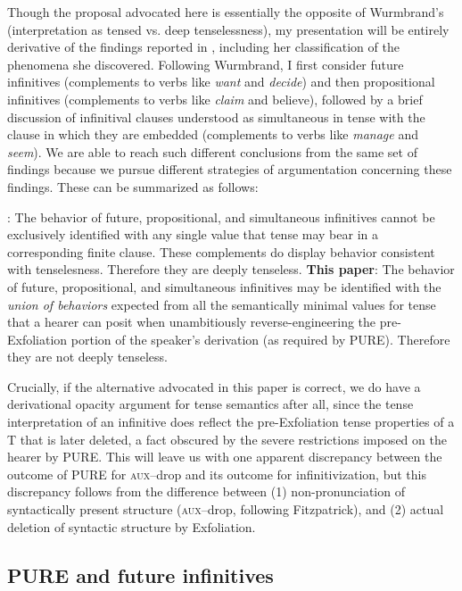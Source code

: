 \documentclass[output=paper]{langscibook}
\begin{document}
Though the proposal advocated here is essentially the opposite of Wurmbrand's (interpretation as tensed vs. deep tenselessness), my presentation will be entirely derivative of the findings reported in \citet{Wurmbrand:2014aa}, including her classification of the phenomena she discovered. Following Wurmbrand, I first consider future infinitives (complements to verbs like \textit{want} and \textit{decide}) and then propositional infinitives (complements to verbs like \textit{claim} and believe), followed by a brief discussion of infinitival clauses understood as simultaneous in tense with the clause in which they are embedded (complements to verbs like \textit{manage} and \textit{seem}). We are able to reach such different conclusions from the same set of findings because we pursue different strategies of argumentation concerning these findings. These can be summarized as follows:

\pex
{}
\a \textbf{\citet{Wurmbrand:2014aa}}: The behavior of future, propositional, and simultaneous infinitives cannot be exclusively identified with any single value that tense may bear in a corresponding finite clause. These complements do display behavior consistent with tenselesness.  Therefore they are deeply tenseless.
\a \textbf{This paper}: The behavior of future, propositional, and simultaneous infinitives may be identified with the \textit{union of behaviors} expected from all the semantically minimal values for tense that a hearer can posit when unambitiously reverse-engineering the pre-Exfoliation portion of the speaker's derivation (as required by PURE).  Therefore they are not deeply tenseless.
\xe

Crucially, if the alternative advocated in this paper is correct, we do have a derivational opacity argument for tense semantics after all, since the tense interpretation of an infinitive does reflect the pre-Exfoliation tense properties of a T that is later deleted, a fact obscured by the severe restrictions imposed on the hearer by PURE. This will leave us with one apparent discrepancy between the outcome of PURE for \textsc{aux}--drop and its outcome for infinitivization, but this discrepancy follows from the difference between (1) non-pronunciation of syntactically present structure (\textsc{aux}--drop, following Fitzpatrick), and (2) actual deletion of syntactic structure by Exfoliation.

\subsection{PURE and future infinitives}
\end{document}
